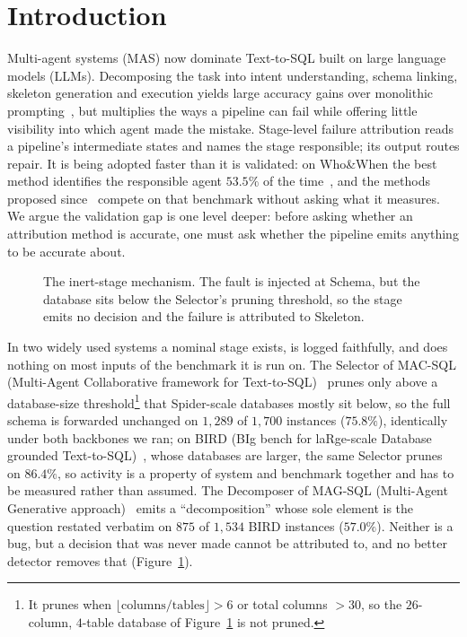 \documentclass{llncs}
\begin{document}
\section{Introduction}


Multi-agent systems (MAS) now dominate Text-to-SQL built on large language
models (LLMs). Decomposing the
task into intent understanding, schema linking, skeleton generation and
execution yields large accuracy gains over monolithic
prompting~\cite{pourreza_din-sql_2023,wang_mac-sql_2025,talaei_chess_2024,chaturvedi_sqlofthought_2025,yang_mars-sql_2025},
but multiplies the ways a pipeline can fail while offering little visibility
into which agent made the mistake. Stage-level failure attribution reads a
pipeline's intermediate states and names the stage responsible; its output
routes repair. It is being adopted faster than it is
validated: on Who\&When the best method identifies the responsible agent
$53.5\%$ of the time~\cite{zhang2025which}, and the methods proposed
since~\cite{zhang_agentracer_2025,ge_famas_2025,zhu_raffles_2025} compete on
that benchmark without asking what it measures. We argue the validation gap
is one level deeper: before asking whether an attribution method is
accurate, one must ask whether the pipeline emits anything to be
accurate about.

\begin{figure}[t]
\centering
\resizebox{0.62\textwidth}{!}{}
\caption{The inert-stage mechanism. The fault is injected at Schema, but the
database sits below the Selector's pruning threshold, so the stage emits no
decision and the failure is attributed to Skeleton.}
\label{fig:inert}
\end{figure}

In two widely used systems a nominal stage exists, is logged faithfully, and
does nothing on most inputs of the benchmark it is run on. The Selector of MAC-SQL (Multi-Agent Collaborative framework for Text-to-SQL)~\cite{wang_mac-sql_2025} prunes only above a database-size
threshold\footnote{It prunes when $\lfloor \text{columns}/\text{tables}
\rfloor > 6$ or total columns $> 30$, so the $26$-column, $4$-table database
of Figure~\ref{fig:inert} is not pruned.}
that Spider-scale databases mostly sit below, so the full schema is forwarded
unchanged on $1{,}289$ of $1{,}700$ instances ($75.8\%$), identically under
both backbones we ran; on BIRD (BIg bench for laRge-scale Database grounded Text-to-SQL)~\cite{li_bird_2023}, whose databases are larger, the same Selector
prunes on $86.4\%$, so activity is a property of system and benchmark
together and has to be measured rather than assumed. The Decomposer of MAG-SQL (Multi-Agent Generative approach)~\cite{xie_mag-sql_2024} emits a
``decomposition'' whose sole element is the question restated verbatim on
$875$ of $1{,}534$ BIRD instances ($57.0\%$). Neither is a bug, but a
decision that was never made cannot be attributed to, and no better detector
removes that (Figure~\ref{fig:inert}).
\end{document}
